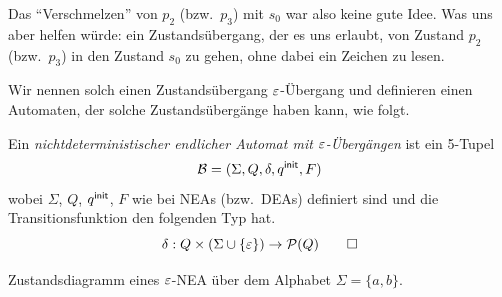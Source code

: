 Das "`Verschmelzen"' von $p_2$ (bzw.\ $p_3$) mit $s_0$ war also keine gute Idee.
Was uns aber helfen würde: ein Zustandsübergang, der es uns erlaubt, von Zustand $p_2$ (bzw.\ $p_3$) in den Zustand $s_0$ zu gehen, ohne dabei ein Zeichen zu lesen.

Wir nennen solch einen Zustandsübergang $\varepsilon$-Übergang und definieren einen Automaten, der solche Zustandsübergänge haben kann, wie folgt.

\begin{Def}\label{def2.EpsNea}
        Ein \emph{nichtdeterministischer endlicher Automat mit $\varepsilon$-Übergängen} ist ein 5-Tupel
        \[ \mathcal{B}= (\Sigma, Q,\delta,q^\mathsf{init},F) \]
wobei $\Sigma$, $Q$, $q^\mathsf{init}$, $F$ wie bei \acs*{NEA}s (bzw.\ \acs*{DEA}s) definiert sind und die Transitionsfunktion den folgenden Typ hat.
\[
\delta:Q\x(\Sigma\cup\{\Eps\})\->\mathcal{P}(Q)
\qedhere
\]
\end{Def}

\begin{Bsp}\label{bsp2.EpsNeaEx} 
   Zustandsdiagramm eines $\varepsilon$-NEA über dem Alphabet $\Sigma=\{a,b\}$.
   \begin{center}
   \end{center}
\end{Bsp}

